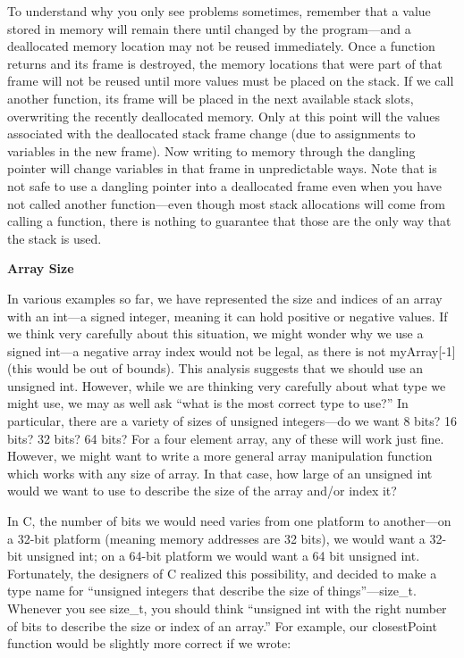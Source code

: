 \documentclass[11pt, a4paper]{article}
\begin{document}
To understand why you only see problems sometimes, remember that a value stored in memory will remain there until changed by the program—and a deallocated memory location may not be reused immediately. Once a function returns and its frame is destroyed, the memory locations that were part of that frame will not be reused until more values must be placed on the stack. If we call another function, its frame will be placed in the next available stack slots, overwriting the recently deallocated memory. Only at this point will the values associated with the deallocated stack frame change (due to assignments to variables in the new frame). Now writing to memory through the dangling pointer will change variables in that frame in unpredictable ways. Note that is not safe to use a dangling pointer into a deallocated frame even when you have not called another function—even though most stack allocations will come from calling a function, there is nothing to guarantee that those are the only way that the stack is used.



\textbf{Array Size}

In various examples so far, we have represented the size and indices of an array with an int—a signed integer, meaning it can hold positive or negative values. If we think very carefully about this situation, we might wonder why we use a signed int—a negative array index would not be legal, as there is not myArray[-1] (this would be out of bounds). This analysis suggests that we should use an unsigned int. However, while we are thinking very carefully about what type we might use, we may as well ask “what is the most correct type to use?” In particular, there are a variety of sizes of unsigned integers—do we want 8 bits? 16 bits? 32 bits? 64 bits? For a four element array, any of these will work just fine. However, we might want to write a more general array manipulation function which works with any size of array. In that case, how large of an unsigned int would we want to use to describe the size of the array and/or index it?



In C, the number of bits we would need varies from one platform to another—on a 32-bit platform (meaning memory addresses are 32 bits), we would want a 32-bit unsigned int; on a 64-bit platform we would want a 64 bit unsigned int. Fortunately, the designers of C realized this possibility, and decided to make a type name for “unsigned integers that describe the size of things”—size\_t. Whenever you see size\_t, you should think “unsigned int with the right number of bits to describe the size or index of an array.” For example, our closestPoint function would be slightly more correct if we wrote:
\end{document}
